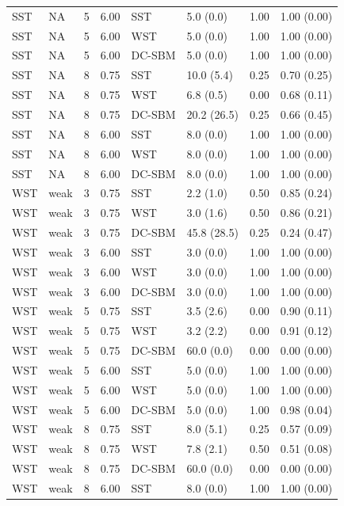 \begin{table}
\begin{tabular}[t]{llrrllll}
\addlinespace
SST & NA & 5 & 6.00 & SST & 5.0 (0.0) & 1.00 & 1.00 (0.00)\\
SST & NA & 5 & 6.00 & WST & 5.0 (0.0) & 1.00 & 1.00 (0.00)\\
SST & NA & 5 & 6.00 & DC-SBM & 5.0 (0.0) & 1.00 & 1.00 (0.00)\\
SST & NA & 8 & 0.75 & SST & 10.0 (5.4) & 0.25 & 0.70 (0.25)\\
SST & NA & 8 & 0.75 & WST & 6.8 (0.5) & 0.00 & 0.68 (0.11)\\
\addlinespace
SST & NA & 8 & 0.75 & DC-SBM & 20.2 (26.5) & 0.25 & 0.66 (0.45)\\
SST & NA & 8 & 6.00 & SST & 8.0 (0.0) & 1.00 & 1.00 (0.00)\\
SST & NA & 8 & 6.00 & WST & 8.0 (0.0) & 1.00 & 1.00 (0.00)\\
SST & NA & 8 & 6.00 & DC-SBM & 8.0 (0.0) & 1.00 & 1.00 (0.00)\\
WST & weak & 3 & 0.75 & SST & 2.2 (1.0) & 0.50 & 0.85 (0.24)\\
\addlinespace
WST & weak & 3 & 0.75 & WST & 3.0 (1.6) & 0.50 & 0.86 (0.21)\\
WST & weak & 3 & 0.75 & DC-SBM & 45.8 (28.5) & 0.25 & 0.24 (0.47)\\
WST & weak & 3 & 6.00 & SST & 3.0 (0.0) & 1.00 & 1.00 (0.00)\\
WST & weak & 3 & 6.00 & WST & 3.0 (0.0) & 1.00 & 1.00 (0.00)\\
WST & weak & 3 & 6.00 & DC-SBM & 3.0 (0.0) & 1.00 & 1.00 (0.00)\\
\addlinespace
WST & weak & 5 & 0.75 & SST & 3.5 (2.6) & 0.00 & 0.90 (0.11)\\
WST & weak & 5 & 0.75 & WST & 3.2 (2.2) & 0.00 & 0.91 (0.12)\\
WST & weak & 5 & 0.75 & DC-SBM & 60.0 (0.0) & 0.00 & 0.00 (0.00)\\
WST & weak & 5 & 6.00 & SST & 5.0 (0.0) & 1.00 & 1.00 (0.00)\\
WST & weak & 5 & 6.00 & WST & 5.0 (0.0) & 1.00 & 1.00 (0.00)\\
\addlinespace
WST & weak & 5 & 6.00 & DC-SBM & 5.0 (0.0) & 1.00 & 0.98 (0.04)\\
WST & weak & 8 & 0.75 & SST & 8.0 (5.1) & 0.25 & 0.57 (0.09)\\
WST & weak & 8 & 0.75 & WST & 7.8 (2.1) & 0.50 & 0.51 (0.08)\\
WST & weak & 8 & 0.75 & DC-SBM & 60.0 (0.0) & 0.00 & 0.00 (0.00)\\
WST & weak & 8 & 6.00 & SST & 8.0 (0.0) & 1.00 & 1.00 (0.00)\\

\end{tabular}
\end{table}
